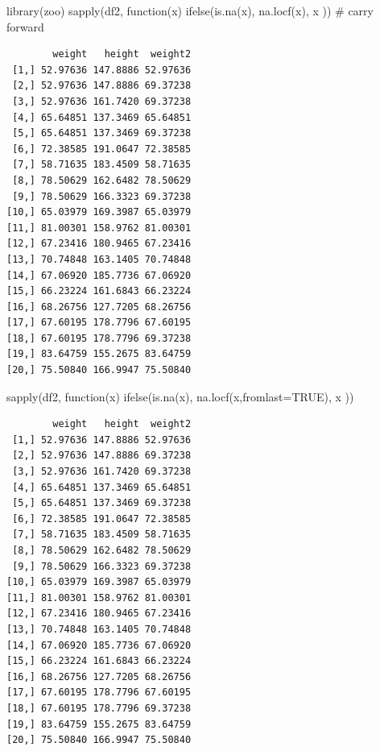 \documentclass[
  letterpaper,
  DIV=11,
  numbers=noendperiod]{scrreprt}
\newenvironment{Shaded}{\begin{snugshade}}{\end{snugshade}}
\newcommand{\AttributeTok}[1]{\textcolor[rgb]{0.40,0.45,0.13}{#1}}
\newcommand{\CommentTok}[1]{\textcolor[rgb]{0.37,0.37,0.37}{#1}}
\newcommand{\ConstantTok}[1]{\textcolor[rgb]{0.56,0.35,0.01}{#1}}
\newcommand{\ControlFlowTok}[1]{\textcolor[rgb]{0.00,0.23,0.31}{#1}}
\newcommand{\FunctionTok}[1]{\textcolor[rgb]{0.28,0.35,0.67}{#1}}
\newcommand{\NormalTok}[1]{\textcolor[rgb]{0.00,0.23,0.31}{#1}}
\begin{document}
\begin{Shaded}
\begin{Highlighting}[]
\FunctionTok{library}\NormalTok{(zoo)}
\FunctionTok{sapply}\NormalTok{(df2, }\ControlFlowTok{function}\NormalTok{(x) }\FunctionTok{ifelse}\NormalTok{(}\FunctionTok{is.na}\NormalTok{(x), }\FunctionTok{na.locf}\NormalTok{(x), x )) }\CommentTok{\# carry forward}
\end{Highlighting}
\end{Shaded}

\begin{verbatim}
        weight   height  weight2
 [1,] 52.97636 147.8886 52.97636
 [2,] 52.97636 147.8886 69.37238
 [3,] 52.97636 161.7420 69.37238
 [4,] 65.64851 137.3469 65.64851
 [5,] 65.64851 137.3469 69.37238
 [6,] 72.38585 191.0647 72.38585
 [7,] 58.71635 183.4509 58.71635
 [8,] 78.50629 162.6482 78.50629
 [9,] 78.50629 166.3323 69.37238
[10,] 65.03979 169.3987 65.03979
[11,] 81.00301 158.9762 81.00301
[12,] 67.23416 180.9465 67.23416
[13,] 70.74848 163.1405 70.74848
[14,] 67.06920 185.7736 67.06920
[15,] 66.23224 161.6843 66.23224
[16,] 68.26756 127.7205 68.26756
[17,] 67.60195 178.7796 67.60195
[18,] 67.60195 178.7796 69.37238
[19,] 83.64759 155.2675 83.64759
[20,] 75.50840 166.9947 75.50840
\end{verbatim}

\begin{Shaded}
\begin{Highlighting}[]
\FunctionTok{sapply}\NormalTok{(df2, }\ControlFlowTok{function}\NormalTok{(x) }\FunctionTok{ifelse}\NormalTok{(}\FunctionTok{is.na}\NormalTok{(x), }\FunctionTok{na.locf}\NormalTok{(x,}\AttributeTok{fromlast=}\ConstantTok{TRUE}\NormalTok{), x ))}
\end{Highlighting}
\end{Shaded}

\begin{verbatim}
        weight   height  weight2
 [1,] 52.97636 147.8886 52.97636
 [2,] 52.97636 147.8886 69.37238
 [3,] 52.97636 161.7420 69.37238
 [4,] 65.64851 137.3469 65.64851
 [5,] 65.64851 137.3469 69.37238
 [6,] 72.38585 191.0647 72.38585
 [7,] 58.71635 183.4509 58.71635
 [8,] 78.50629 162.6482 78.50629
 [9,] 78.50629 166.3323 69.37238
[10,] 65.03979 169.3987 65.03979
[11,] 81.00301 158.9762 81.00301
[12,] 67.23416 180.9465 67.23416
[13,] 70.74848 163.1405 70.74848
[14,] 67.06920 185.7736 67.06920
[15,] 66.23224 161.6843 66.23224
[16,] 68.26756 127.7205 68.26756
[17,] 67.60195 178.7796 67.60195
[18,] 67.60195 178.7796 69.37238
[19,] 83.64759 155.2675 83.64759
[20,] 75.50840 166.9947 75.50840
\end{verbatim}
\end{document}
